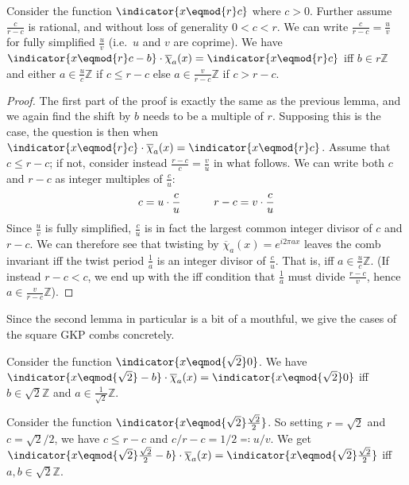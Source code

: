 \begin{lemma}\label{lem:comb_function_symmetries_c}
    Consider the function $\indicator{x \eqmod{r} c}$ where $c > 0$.
    Further assume $\frac{c}{r - c}$ is rational, and without loss of generality $0 < c < r$.
    We can write $\frac{c}{r - c} = \frac{u}{v}$ for fully simplified $\frac{u}{v}$ (i.e.\ $u$ and $v$ are coprime).
    We have $\indicator{x \eqmod{r} c - b} \cdot \overline{\chi}_a(x) = \indicator{x \eqmod{r} c}$ iff $b \in r\mathbb{Z}$ and either $a \in \frac{u}{c}\mathbb{Z}$ if $c \leq r - c$ else $a \in \frac{v}{r - c}\mathbb{Z}$ if $c > r - c$.
    \begin{proof}
        The first part of the proof is exactly the same as the previous lemma, and we again find the shift by $b$ needs to be a multiple of $r$.
        Supposing this is the case, the question is then when $\indicator{x \eqmod{r} c} \cdot \overline{\chi}_a(x) = \indicator{x \eqmod{r} c}$.
        Assume that $c \leq r - c$; if not, consider instead $\frac{r - c}{c} = \frac{v}{u}$ in what follows.
        We can write both $c$ and $r - c$ as integer multiples of $\frac{c}{u}$:
        \begin{equation}
            c = u \cdot \frac{c}{u}
            \quad\qquad
            r - c = v \cdot \frac{c}{u}
        \end{equation}
        Since $\frac{u}{v}$ is fully simplified, $\frac{c}{u}$ is in fact the largest common integer divisor of $c$ and $r - c$.
        We can therefore see that twisting by $\overline{\chi}_a(x) = e^{i2\pi ax}$ leaves the comb invariant iff the twist period $\frac{1}{a}$ is an integer divisor of $\frac{c}{u}$.
        That is, iff $a \in \frac{u}{c}\mathbb{Z}$.
        (If instead $r - c < c$, we end up with the iff condition that $\frac{1}{a}$ must divide $\frac{r - c}{v}$, hence $a \in \frac{v}{r - c}\mathbb{Z}$).
    \end{proof}
\end{lemma}

Since the second lemma in particular is a bit of a mouthful, we give the cases of the square GKP combs concretely.

\begin{example}
    Consider the function $\indicator{x \eqmod{\sqrt{2}} 0}$.
    We have $\indicator{x \eqmod{\sqrt{2}} - b} \cdot \overline{\chi}_a(x) = \indicator{x \eqmod{\sqrt{2}} 0}$ iff $b \in \sqrt{2}\mathbb{Z}$ and $a \in \frac{1}{\sqrt{2}}\mathbb{Z}$.
\end{example}

\begin{example}
    Consider the function $\indicator{x \eqmod{\sqrt{2}} \frac{\sqrt{2}}{2}}$.
    So setting $r = \sqrt{2}$ and $c = \sqrt{2}/2$, we have $c \leq r - c$ and $c/r-c = 1/2 \eqqcolon u/v$.
    We get $\indicator{x \eqmod{\sqrt{2}} \frac{\sqrt{2}}{2} - b} \cdot \overline{\chi}_a(x) = \indicator{x \eqmod{\sqrt{2}} \frac{\sqrt{2}}{2}}$ iff $a, b \in \sqrt{2}\mathbb{Z}$.
\end{example}

